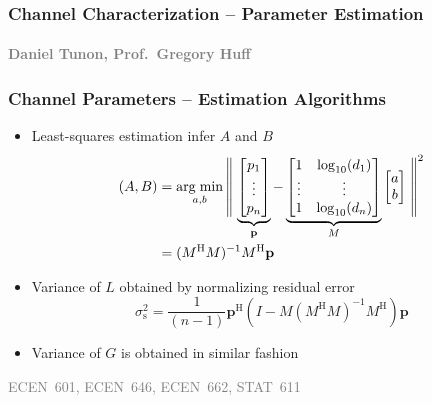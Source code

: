 \documentclass{beamer}
\newlength\tikzheight
\newlength\tikzwidth
\begin{document}
\begin{frame}
\frametitle{Channel Characterization -- Parameter Estimation}
\framesubtitle{\textcolor{gray}{\scriptsize Daniel Tunon, Prof.~Gregory Huff}}
  \begin{center}
  \setlength{}
  \setlength{}
  
  \end{center}
\end{frame}

\begin{frame}
\frametitle{Channel Parameters -- Estimation Algorithms}
\begin{itemize}
    \item Least-squares estimation infer $A$ and $B$
      \begin{align*}
      (A, B) &= \operatorname*{arg\;min}_{a,b}
      \left\| \vphantom{ \begin{bmatrix} p_1 \\ \vdots \\
      p_n \end{bmatrix}} \right.
      \underbrace{\begin{bmatrix} p_1 \\ \vdots \\
      p_n \end{bmatrix}}_{\mathbf{p}}
      - \underbrace{\begin{bmatrix} 1 & \log_{10} (d_1) \\
      \vdots & \vdots \\ 1 & \log_{10} (d_n) \end{bmatrix}}_{M}
      \begin{bmatrix} a \\ b \end{bmatrix}
      \left. \vphantom{ \begin{bmatrix} p_1 \\ \vdots \\
      p_n \end{bmatrix}} \right\|^2 \\
      &= (M^{\mathrm{H}} M)^{-1} M^{\mathrm{H}} \mathbf{p}
      \end{align*}
    \item Variance of $L$ obtained by normalizing residual error
      \begin{equation*}
      \sigma_{\mathrm{s}}^2
      = \frac{1}{(n-1)} \mathbf{p}^{\mathrm{H}}
      \left( I - M(M^{\mathrm{H}} M)^{-1} M^{\mathrm{H}} \right) \mathbf{p}
      \end{equation*}
    \item Variance of $G$ is obtained in similar fashion
\end{itemize}
\vfill
\textcolor{gray}{\tiny ECEN~601, ECEN~646, ECEN~662, STAT~611}
\end{frame}
\end{document}
